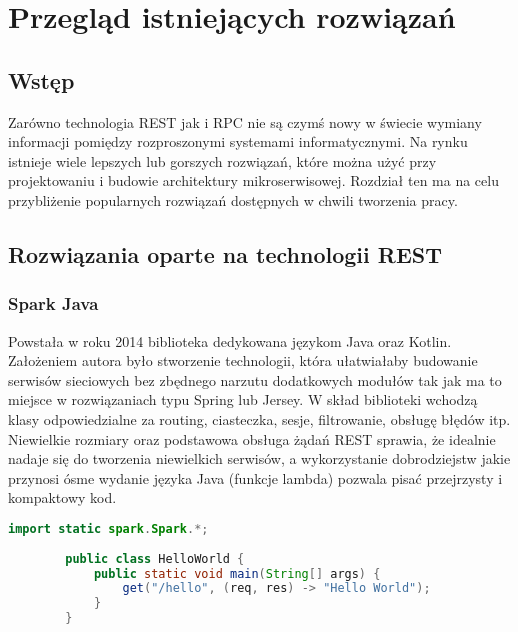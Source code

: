 \chapter{Przegląd istniejących rozwiązań}
\section{Wstęp}
Zarówno technologia REST jak i RPC nie są czymś nowy w świecie wymiany informacji pomiędzy rozproszonymi systemami informatycznymi. Na rynku istnieje wiele lepszych lub gorszych rozwiązań, które można użyć przy projektowaniu i budowie architektury mikroserwisowej. Rozdział ten ma na celu przybliżenie popularnych rozwiązań dostępnych w chwili tworzenia pracy.
\section{Rozwiązania oparte na technologii REST}
\subsection{Spark Java}
Powstała w roku 2014 biblioteka dedykowana językom Java oraz Kotlin. Założeniem autora było stworzenie technologii, która ułatwiałaby budowanie serwisów sieciowych bez zbędnego narzutu dodatkowych modułów tak jak ma to miejsce w rozwiązaniach typu Spring lub Jersey. W skład biblioteki wchodzą klasy odpowiedzialne za routing, ciasteczka, sesje, filtrowanie, obsługę błędów itp. Niewielkie rozmiary oraz podstawowa obsługa żądań REST sprawia, że idealnie nadaje się do tworzenia niewielkich serwisów, a wykorzystanie dobrodziejstw jakie przynosi ósme wydanie języka Java (funkcje lambda) pozwala pisać przejrzysty i kompaktowy kod.
\begin{lstlisting}[language=Java, caption=Przykład metody zwracającej tekst w Spark Java]
        import static spark.Spark.*;
        
        public class HelloWorld {
            public static void main(String[] args) {
                get("/hello", (req, res) -> "Hello World");
            } 
        }
        \end{lstlisting}
